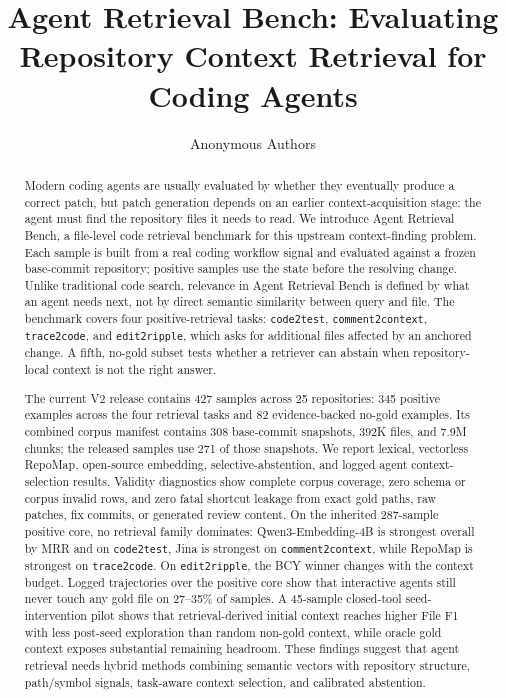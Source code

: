 \documentclass[11pt]{article}
\title{Agent Retrieval Bench: Evaluating Repository Context Retrieval for Coding Agents}
\author{Anonymous Authors}
\date{}
\newcommand{\arb}{Agent Retrieval Bench}
\newcommand{\code}[1]{\texttt{#1}}
\begin{document}
\maketitle

\begin{abstract}
Modern coding agents are usually evaluated by whether they eventually produce a correct patch, but patch generation depends on an earlier context-acquisition stage: the agent must find the repository files it needs to read. We introduce \arb{}, a file-level code retrieval benchmark for this upstream context-finding problem. Each sample is built from a real coding workflow signal and evaluated against a frozen base-commit repository; positive samples use the state before the resolving change. Unlike traditional code search, relevance in \arb{} is defined by what an agent needs next, not by direct semantic similarity between query and file. The benchmark covers four positive-retrieval tasks: \code{code2test}, \code{comment2context}, \code{trace2code}, and \code{edit2ripple}, which asks for additional files affected by an anchored change. A fifth, no-gold subset tests whether a retriever can abstain when repository-local context is not the right answer.

The current V2 release contains 427 samples across 25 repositories: 345 positive examples across the four retrieval tasks and 82 evidence-backed no-gold examples. Its combined corpus manifest contains 308 base-commit snapshots, 392K files, and 7.9M chunks; the released samples use 271 of those snapshots. We report lexical, vectorless RepoMap, open-source embedding, selective-abstention, and logged agent context-selection results. Validity diagnostics show complete corpus coverage, zero schema or corpus invalid rows, and zero fatal shortcut leakage from exact gold paths, raw patches, fix commits, or generated review content. On the inherited 287-sample positive core, no retrieval family dominates: Qwen3-Embedding-4B is strongest overall by MRR and on \code{code2test}, Jina is strongest on \code{comment2context}, while RepoMap is strongest on \code{trace2code}. On \code{edit2ripple}, the BCY winner changes with the context budget. Logged trajectories over the positive core show that interactive agents still never touch any gold file on 27--35\% of samples. A 45-sample closed-tool seed-intervention pilot shows that retrieval-derived initial context reaches higher File F1 with less post-seed exploration than random non-gold context, while oracle gold context exposes substantial remaining headroom. These findings suggest that agent retrieval needs hybrid methods combining semantic vectors with repository structure, path/symbol signals, task-aware context selection, and calibrated abstention.
\end{abstract}
\end{document}
